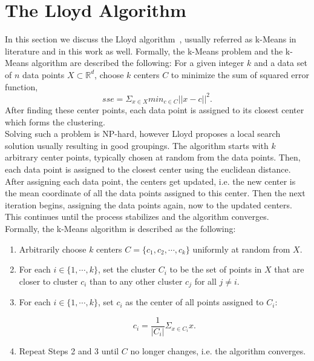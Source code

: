 \section{The Lloyd Algorithm}

In this section we discuss the Lloyd algorithm~\parencite{Lloyd82}, usually referred as k-Means in literature and in this work as well. Formally, the k-Means problem and the k-Means algorithm are described the following: For a given integer $k$ and a data set of $n$ data points $X \subset  \mathbb{R}^d$, choose $k$ centers $C$ to minimize the sum of squared error function,
\begin{equation*}
sse = \Sigma_{x \in X} min_{c \in C} ||x - c||^2.
\end{equation*}
After finding these center points, each data point is assigned to its closest center which forms the clustering. 
\\ 
Solving such a problem is NP-hard, however Lloyd proposes a local search solution usually resulting in good groupings. The algorithm starts with $k$ arbitrary center points, typically chosen at random from the data points. Then, each data point is assigned to the closest center using the euclidean distance. After assigning each data point, the centers get updated, i.e. the new center is the mean coordinate of all the data points assigned to this center. Then the next iteration begins, assigning the data points again, now to the updated centers. This continues until the process stabilizes and the algorithm converges.
\\
Formally, the k-Means algorithm is described as the following:

\begin{enumerate} 
\item Arbitrarily choose $k$ centers $C = \{c_1, c_2, \cdots, c_k\}$ uniformly at random from $X$.
\item For each $i \in \{1, \cdots, k\}$, set the cluster $C_i$ to be the set of points in $X$ that are closer to cluster $c_i$ than to any other cluster $c_j$ for all $j \neq i$.
\item For each $i \in \{1, \cdots, k\}$, set $c_i$ as the center of all points assigned to $C_i$: 

\begin{equation*}
c_i = \frac{1}{|C_i|} \Sigma_{x \in C_i} x.
\end{equation*}

\item Repeat Steps 2 and 3 until $C$ no longer changes, i.e. the algorithm converges.
\end{enumerate}

